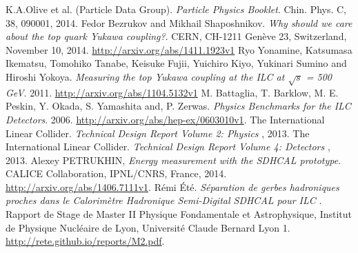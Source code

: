 \begin{thebibliography}{ABC}	
     K.A.Olive et al. (Particle Data Group). \emph{Particle Physics Booklet}. Chin. Phys. C, 38, 090001, 2014.
     Fedor Bezrukov and Mikhail Shaposhnikov. \emph{Why should we care about the top quark Yukawa coupling?}. CERN, CH-1211 Genève 23, Switzerland, November 10, 2014. \url{http://arxiv.org/abs/1411.1923v1}
     Ryo Yonamine, Katsumasa Ikematsu, Tomohiko Tanabe, Keisuke Fujii, Yuichiro Kiyo, Yukinari Sumino and Hiroshi Yokoya. \emph{Measuring the top Yukawa coupling at the ILC at $\sqrt{s}$ = 500 GeV}. 2011. \url{http://arxiv.org/abs/1104.5132v1}
       M. Battaglia, T. Barklow, M. E. Peskin, Y. Okada, S. Yamashita and, P. Zerwas.  \emph{Physics Benchmarks for the ILC Detectors}. 2006. \url{http://arxiv.org/abs/hep-ex/0603010v1}.
     The International Linear Collider. \emph{Technical Design Report Volume 2: Physics} , 2013.
     The International Linear Collider. \emph{Technical Design Report Volume 4: Detectors} , 2013.
      Alexey PETRUKHIN, \emph{Energy measurement with the SDHCAL prototype}. CALICE Collaboration, IPNL/CNRS, France, 2014. \url{http://arxiv.org/abs/1406.7111v1}.
     Rémi Été. \emph{Séparation de gerbes hadroniques proches dans le Calorimètre Hadronique Semi-Digital SDHCAL pour ILC }. Rapport de Stage de Master II Physique Fondamentale et Astrophysique, Institut de Physique Nucléaire de Lyon, Université Claude Bernard Lyon 1. \url{http://rete.github.io/reports/M2.pdf}.
\end{thebibliography}
